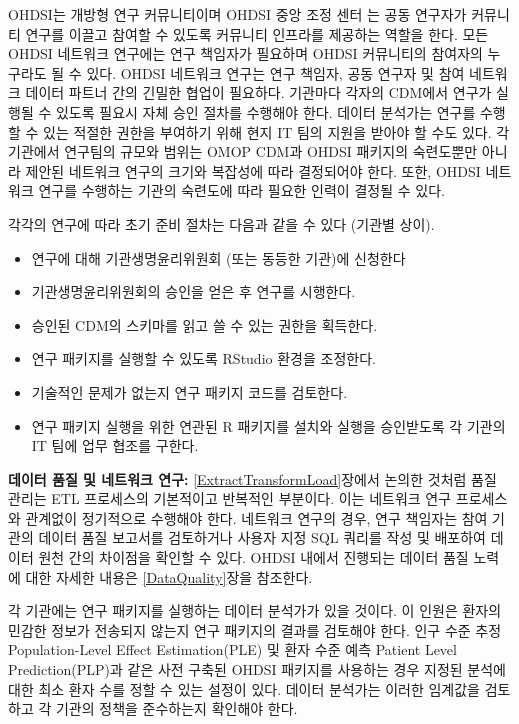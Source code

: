 \documentclass[10.5pt]{book}
\providecommand{\tightlist}{%
  \setlength{\itemsep}{0pt}\setlength{\parskip}{0pt}}
\theoremstyle{definition}
\theoremstyle{definition}
\theoremstyle{definition}
\theoremstyle{remark}
\let\BeginKnitrBlock\begin \let\EndKnitrBlock\end
\begin{document}

OHDSI는 개방형 연구 커뮤니티이며 OHDSI 중앙 조정 센터 는 공동 연구자가
커뮤니티 연구를 이끌고 참여할 수 있도록 커뮤니티 인프라를 제공하는
역할을 한다. 모든 OHDSI 네트워크 연구에는 연구 책임자가 필요하며 OHDSI
커뮤니티의 참여자의 누구라도 될 수 있다. OHDSI 네트워크 연구는 연구
책임자, 공동 연구자 및 참여 네트워크 데이터 파트너 간의 긴밀한 협업이
필요하다. 기관마다 각자의 CDM에서 연구가 실행될 수 있도록 필요시 자체
승인 절차를 수행해야 한다. 데이터 분석가는 연구를 수행할 수 있는 적절한
권한을 부여하기 위해 현지 IT 팀의 지원을 받아야 할 수도 있다. 각
기관에서 연구팀의 규모와 범위는 OMOP CDM과 OHDSI 패키지의 숙련도뿐만
아니라 제안된 네트워크 연구의 크기와 복잡성에 따라 결정되어야 한다.
또한, OHDSI 네트워크 연구를 수행하는 기관의 숙련도에 따라 필요한 인력이
결정될 수 있다.

각각의 연구에 따라 초기 준비 절차는 다음과 같을 수 있다 (기관별 상이).

\begin{itemize}
\tightlist
\item
  연구에 대해 기관생명윤리위원회 (또는 동등한 기관)에 신청한다
\item
  기관생명윤리위원회의 승인을 얻은 후 연구를 시행한다.
\item
  승인된 CDM의 스키마를 읽고 쓸 수 있는 권한을 획득한다.
\item
  연구 패키지를 실행할 수 있도록 RStudio 환경을 조정한다.
\item
  기술적인 문제가 없는지 연구 패키지 코드를 검토한다.
\item
  연구 패키지 실행을 위한 연관된 R 패키지를 설치와 실행을 승인받도록 각
  기관의 IT 팀에 업무 협조를 구한다.
\end{itemize}

\BeginKnitrBlock{rmdimportant}
\textbf{데이터 품질 및 네트워크 연구:} \ref{ExtractTransformLoad}장에서
논의한 것처럼 품질 관리는 ETL 프로세스의 기본적이고 반복적인 부분이다.
이는 네트워크 연구 프로세스와 관계없이 정기적으로 수행해야 한다.
네트워크 연구의 경우, 연구 책임자는 참여 기관의 데이터 품질 보고서를
검토하거나 사용자 지정 SQL 쿼리를 작성 및 배포하여 데이터 원천 간의
차이점을 확인할 수 있다. OHDSI 내에서 진행되는 데이터 품질 노력에 대한
자세한 내용은 \ref{DataQuality}장을 참조한다.
\EndKnitrBlock{rmdimportant}

각 기관에는 연구 패키지를 실행하는 데이터 분석가가 있을 것이다. 이
인원은 환자의 민감한 정보가 전송되지 않는지 연구 패키지의 결과를
검토해야 한다. 인구 수준 추정 Population-Level Effect Estimation(PLE) 및
환자 수준 예측 Patient Level Prediction(PLP)과 같은 사전 구축된 OHDSI
패키지를 사용하는 경우 지정된 분석에 대한 최소 환자 수를 정할 수 있는
설정이 있다. 데이터 분석가는 이러한 임계값을 검토하고 각 기관의 정책을
준수하는지 확인해야 한다.
\end{document}
